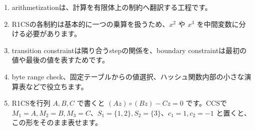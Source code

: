 \documentclass[a4paper,11pt]{ltjsarticle}
\begin{document}
\begin{enumerate}
  \item arithmetizationは、計算を有限体上の制約へ翻訳する工程です。
  \item R1CSの各制約は基本的に一つの乗算を扱うため、\(x^2\) や \(x^3\) を中間変数に分ける必要があります。
  \item transition constraintは隣り合うstepの関係を、boundary constraintは最初の値や最後の値を表すためです。
  \item byte range check、固定テーブルからの値選択、ハッシュ関数内部の小さな演算表などで役立ちます。
  \item R1CSを行列 \(A,B,C\) で書くと \((Az)\circ(Bz)-Cz=0\) です。CCSで \(M_1=A,M_2=B,M_3=C\)、\(S_1=\{1,2\},S_2=\{3\}\)、\(c_1=1,c_2=-1\) と置くと、この形をそのまま表せます。
\end{enumerate}
\end{document}
